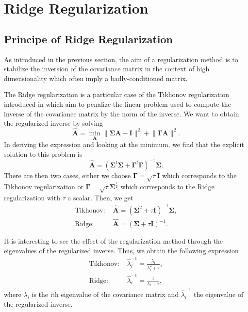 \documentclass[a4paper,11pt,DIV=16,abstracton]{scrartcl}
\begin{document}
\section{Ridge Regularization}
\label{sec:regularization}

    \subsection{Principe of Ridge Regularization}
    As introduced in the previous section, the aim of a regularization method is to stabilize the inversion of the covariance matrix in the context of high dimensionality which often imply a badly-conditioned matrix.

    The Ridge regularization is a particular case of the Tikhonov regularization introduced in \cite{hoerl1970ridge} which aim to penalize the linear problem used to compute the inverse of the covariance matrix by the norm of the inverse. We want to obtain the regularized inverse by solving
    \begin{equation}
        \hat{\mathbf{A}} = \min_\mathbf{A} \lVert\boldsymbol{\Sigma} \mathbf{A} - \mathbf{I}\rVert^2 + \lVert\boldsymbol{\Gamma}\mathbf{A}\rVert^2.
    \end{equation}
    In deriving the expression and looking at the minimum, we find that the explicit solution to this problem is
    \begin{equation}
        \hat{\mathbf{A}} = (\boldsymbol{\Sigma}^t\boldsymbol{\Sigma} + \boldsymbol{\Gamma}^t \boldsymbol{\Gamma})^{-1} \boldsymbol{\Sigma}.
    \end{equation}
    There are then two cases, either we choose $\boldsymbol{\Gamma} = \sqrt{\tau} \mathbf{I}$ which corresponds to the Tikhonov regularization or $\boldsymbol{\Gamma} = \sqrt{\tau} \boldsymbol{\Sigma}^{\frac{1}{2}}$ which corresponds to the Ridge regularization with $\tau$ a scalar. Then, we get
    \begin{align}
        \text{Tikhonov: }& \hat{\mathbf{A}} = (\boldsymbol{\Sigma}^2 + \tau \mathbf{I})^{-1} \boldsymbol{\Sigma},\\
        \text{Ridge: }& \hat{\mathbf{A}} = (\boldsymbol{\Sigma} + \tau \mathbf{I})^{-1}.
    \end{align}

    It is interesting to see the effect of the regularization method through the eigenvalues of the regularized inverse. Thus, we obtain the following expression
    \begin{align}
        \text{Tikhonov: }& \hat{\lambda}_i^{-1} = \frac{\lambda_i}{\lambda_i^2 + \tau},\\
        \text{Ridge: }& \hat{\lambda}_i^{-1} = \frac{1}{\lambda_i + \tau},
    \end{align}
    where $\lambda_i$ is the ith eigenvalue of the covariance matrix and $\hat{\lambda}_i^{-1}$ the eigenvalue of the regularized inverse.
\end{document}
